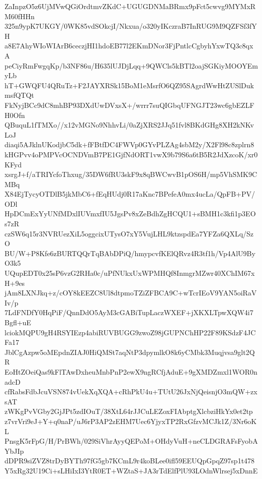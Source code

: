ZaInpzO5z6UjMVwQGiOrdtmvZKdC+UGUGDNMaBRmx9pFct5cwvg9MYMxRM60fHHn
325n9ypK7UKGY/0WK85vdSOkcjI/Nkxua/o320yIKczraB7InRUG9M9QZFSf3fYH
a8E7AhyWIoWIArB6ceczjHI1hdoEB77l2EKmDNor3FjPntlcCgbyhYxwTQ3c8qxA
peCiyRmFwgqKp/b3NF86u/H635lUJDjLqq+9QWCls5kBTl2oajSGKiyMOOYEmyLb
hT+GWQFU4QRuTz+F2JAYXRSk15BoM1eMsrfO6QZ95SAgrdWwHtZUSlDukmsfQTQt
FkNyjBCc9dC8mhBP93DXdUwDVxsX+/wrrr7suQIGbqUFNGJT23wc6gbEZLFH0Ofn
QBuquL1fTMXo//x12vMGNo9NhhvLi/0aZjXRS2JJq51fvl8BKdGHg8XH2kNKvLoJ
diaqi5AJklnUKodjbC5dk+fFBtfDC4FWVp0GYvPLZAg4sbM2y/X2Fl98c8zplrn8
kHGPvv4oPMPVcOCNDVmB7PE1GjfNdORT1vwX9b79S6a6tB5R2JdXzcoK/xr0KFyd
xsrgJ+f/aTRIYcfoThxug/35DW6fRU3skF9x8qBWCwvB1pOS6H/mp5VhSMK9CMBq
X84EjTycyOTDlB5jkMbC6+fEqHUdj0R17aKnc7BPefeA0mx4ucLa/QpFB+PV/ODl
HpDCmExYyUNfMDxlIUVmxfIU5JgsPv8xZeBdhZgHCQU1+sBMH1c3kfi1p3EOs7zR
czSW6q15r3NVRUezXiL5oggcixUTysO7xY5VujLHL9ktzspdEa7YFZa6QXLq/SzO
BU/W+P8Kfe6zBURTQQrTqBAbDPiQ/hmypcvfKElQRvz4R3tf1h/Vp4AlU9ByO3k5
UQupEDT0x25sP6vzG2RHa0c/uPfNUkxUxWPMHQf8InmgrMZwr40XChIM67xH+9es
jAm8LXNJkq+z/cOY8kEEZC8Ul8dtpmoTZiZFBCA9C+wTcrIEoV9YAN5oiRaVIv/p
7LdFNDfY0HqPiF/QnnDdO5AyM3cGABiTupLaczWXEF+jXKXLTpwXQW4i7Bgfl+uE
lciokMQPU9gH4RSYIEzp4abiRUVBUGG9zwoZ98jGUPNChHP22F89KSdzF4JCFa17
JblCgAzpw5oMEpdnZIAJ0HiQMSt7aqNtP3dpymlkO8k6yCMbk3Muqjvsa9glt2QR
EoHtZOeiQas9kFlTAwDxheuMnbPnP2ewX9ngRCfjAduE+9gXMDZmxl1WOR0nadcD
cfRabsFdbJcuVSN874vUekXqXQA+cRhPkU4u+TUtU26JxNjQeisnjO3mQW+zxsAT
zWKgPvVGby2GjJPt5zdIOuT/38XtL64rJJCuLEZoxFIAbptgXlcbziHkYx0et2tp
z7vrVri9eJ+Y+q0naP/uJ6rP3AP2zEHM7Uec6YjyxTP2RxGfzvMCJk1Z/3Nr6oKL
PnsgK5rFpG/H/PrBWh/029SiVhrAyyQEPoM+OHdyVuH+neCLDGRAFsFyobAYbJIp
dDPR9siZVZ8trDyBYTh97fG5gb7KCmL9r4koBLee0ifl59EEUQpGpqZ97sp1t478
Y5xRg32U19Ci+sLHiIxI3YtR0ET+WZtaS+JA3rTdElfPlU93LOdnWlrsej5xDnnE

